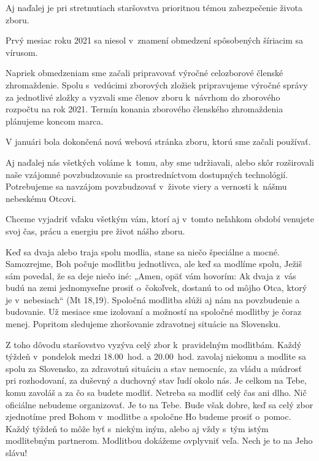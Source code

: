 

Aj naďalej je pri stretnutiach staršovstva prioritnou témou zabezpečenie života zboru.

Prvý mesiac roku 2021 sa niesol v~znamení obmedzení spôsobených šíriacim sa vírusom.

Napriek obmedzeniam sme začali pripravovať výročné celozborové členské zhromaždenie. Spolu s~vedúcimi zborových zložiek pripravujeme výročné správy za jednotlivé zložky a vyzvali sme členov zboru k~návrhom do zborového rozpočtu na rok 2021. Termín konania zborového členského zhromaždenia plánujeme koncom marca.

V januári bola dokončená nová webová stránka zboru, ktorú sme začali používať.

Aj naďalej nás všetkých voláme k~tomu, aby sme udržiavali, alebo skôr rozširovali naše vzájomné povzbudzovanie sa prostredníctvom dostupných technológií. Potrebujeme sa navzájom povzbudzovať v~živote viery a vernosti k~nášmu nebeskému Otcovi.

Chceme vyjadriť vďaku všetkým vám, ktorí aj v~tomto neľahkom období venujete svoj čas, prácu a energiu pre život nášho zboru.



Keď sa dvaja alebo traja spolu modlia, stane sa niečo špeciálne a mocné. Samozrejme, Boh počuje modlitbu jednotlivca, ale keď sa modlíme spolu, Ježiš sám povedal, že sa deje niečo iné: „Amen, opäť vám hovorím: Ak dvaja z~vás budú na zemi jednomyseľne prosiť o~čokoľvek, dostanú to od môjho Otca, ktorý je v~nebesiach“ (Mt 18,19). Spoločná modlitba slúži aj nám na povzbudenie a budovanie. Už mesiace sme izolovaní a možností na spoločné modlitby je čoraz menej. Popritom sledujeme zhoršovanie zdravotnej situácie na Slovensku.

Z toho dôvodu staršovstvo vyzýva celý zbor k~pravidelným modlitbám. Každý týždeň v~pondelok medzi 18.00~hod. a 20.00~hod. zavolaj niekomu a modlite sa spolu za Slovensko, za zdravotnú situáciu a stav nemocníc, za vládu a múdrosť pri rozhodovaní, za duševný a duchovný stav ľudí okolo nás. Je celkom na Tebe, komu zavoláš a za čo sa budete modliť. Netreba sa modliť celý čas ani dlho. Nič oficiálne nebudeme organizovať. Je to na Tebe. Bude však dobre, keď sa celý zbor zjednotíme pred Bohom v~modlitbe a spoločne Ho budeme prosiť o~pomoc. Každý týždeň to môže byť s~niekým iným, alebo aj vždy s~tým istým modlitebným partnerom. Modlitbou dokážeme ovplyvniť veľa. Nech je to na Jeho slávu!
\vfill\break


